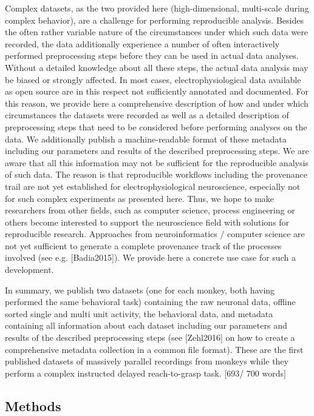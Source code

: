 Complex datasets, as the two provided here (high-dimensional, multi-scale during complex behavior), are a challenge for performing reproducible analysis. Besides the often rather variable nature of the circumstances under which such data were recorded, the data additionally experience a number of often interactively performed preprocessing steps before they can be used in actual data analyses. Without a detailed knowledge about all these steps, the actual data analysis may be biased or strongly affected. In most cases, electrophysiological data available as open source are in this respect not sufficiently annotated and documented. For this reason, we provide here a comprehensive description of how and under which circumstances the datasets were recorded as well as a detailed description of preprocessing steps that need to be considered before performing analyses on the data. We additionally publish a machine-readable format of these metadata including our parameters and results of the described preprocessing steps. We are aware that all this information may not be sufficient for the reproducible analysis of such data. The reason is that reproducible workflows including the provenance trail are not yet established for electrophysiological neuroscience, especially not for such complex experiments as presented here. Thus, we hope to make researchers from other fields, such as computer science, process engineering or others become interested to support the neuroscience field with solutions for reproducible research. Approaches from neuroinformatics / computer science are not yet sufficient to generate a complete provenance track of the processes involved (see e.g. [Badia2015]). We provide here a concrete use case for such a development. 

In summary, we publish two datasets (one for each monkey, both having performed the same behavioral task) containing the raw neuronal data, offline sorted single and multi unit activity, the behavioral data, and metadata containing all information about each dataset including our parameters and results of the described preprocessing steps (see [Zehl2016] on how to create a comprehensive metadata collection in a common file format). These are the first published datasets of massively parallel recordings from monkeys while they perform a complex instructed delayed reach-to-grasp task. [693/ 700 words]

\subsection{Methods} 

